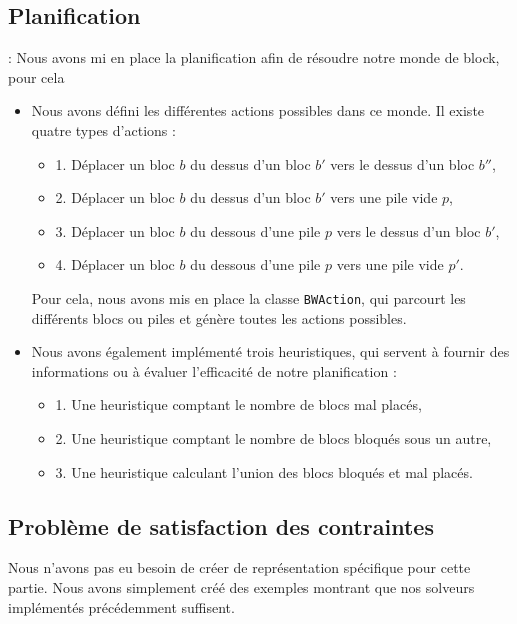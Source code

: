 \documentclass[12pt]{article}
\begin{document}
\begin{itemize}
            \subsection{Planification} : Nous avons mi en place la planification afin de résoudre notre monde de block, pour cela
    \begin{itemize}
        \item Nous avons défini les différentes actions possibles dans ce monde. Il existe quatre types d'actions :
        \begin{itemize}
            \item 1. Déplacer un bloc \(b\) du dessus d’un bloc \(b'\) vers le dessus d’un bloc \(b''\),
            \item 2. Déplacer un bloc \(b\) du dessus d’un bloc \(b'\) vers une pile vide \(p\),
            \item 3. Déplacer un bloc \(b\) du dessous d’une pile \(p\) vers le dessus d’un bloc \(b'\),
            \item 4. Déplacer un bloc \(b\) du dessous d’une pile \(p\) vers une pile vide \(p'\).
        \end{itemize}
        Pour cela, nous avons mis en place la classe \texttt{BWAction}, qui parcourt les différents blocs ou piles et génère toutes les actions possibles.
        
        \item Nous avons également implémenté trois heuristiques, qui servent à fournir des informations ou à évaluer l'efficacité de notre planification :
        \begin{itemize}
            \item 1. Une heuristique comptant le nombre de blocs mal placés,
            \item 2. Une heuristique comptant le nombre de blocs bloqués sous un autre,
            \item 3. Une heuristique calculant l’union des blocs bloqués et mal placés.
        \end{itemize}
    \end{itemize}
    
\subsection{Problème de satisfaction des contraintes}  
Nous n’avons pas eu besoin de créer de représentation spécifique pour cette partie. Nous avons simplement créé des exemples montrant que nos solveurs implémentés précédemment suffisent.


\end{itemize}
\end{document}
